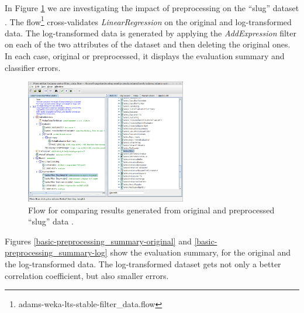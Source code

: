In Figure \ref{basic-preprocessing_flow} we are investigating the impact of
preprocessing on the ``slug'' dataset \cite{slug}. The
flow\footnote{adams-weka-lts-stable-filter\_data.flow} cross-validates
\textit{LinearRegression} on the original and log-transformed data. The
log-transformed data is generated by applying the \textit{AddExpression} filter
on each of the two attributes of the dataset and then deleting the original
ones. In each case, original or preprocessed, it displays the evaluation summary
and classifier errors.

\begin{figure}[htb]
  \centering
  \includegraphics[width=7.0cm]{images/basic-preprocessing_flow.png}
  \caption{Flow for comparing results generated from original and preprocessed
  ``slug'' data \cite{slug}.}
  \label{basic-preprocessing_flow}
\end{figure}

Figures \ref{basic-preprocessing_summary-original} and
\ref{basic-preprocessing_summary-log} show the evaluation summary, for the
original and the log-transformed data. The log-transformed dataset gets not
only a better correlation coefficient, but also smaller errors.

